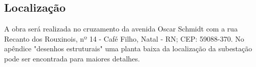 \subsection{Localização}

A obra será realizada no cruzamento da avenida Oscar Schmidt com a rua Recanto dos Rouxinois, nº 14 - Café Filho, Natal - RN; CEP: 59088-370. No apêndice "desenhos estruturais" uma planta baixa da localização da subestação pode ser encontrada para maiores detalhes.